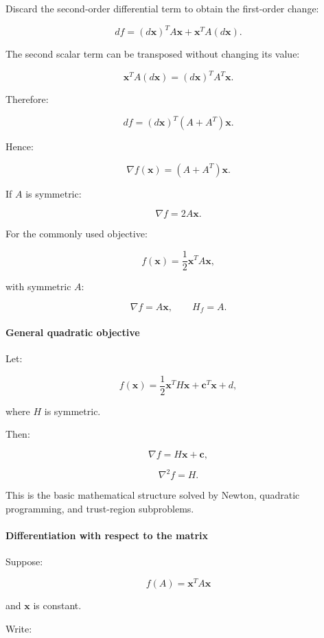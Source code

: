 Discard the second-order differential term to obtain the first-order change:

\[
df= (d\mathbf x)^TA\mathbf x+ \mathbf x^TA(d\mathbf x).
\]

The second scalar term can be transposed without changing its value:

\[
\mathbf x^TA(d\mathbf x) = (d\mathbf x)^TA^T\mathbf x.
\]

Therefore:

\[
df= (d\mathbf x)^T(A+A^T)\mathbf x.
\]

Hence:

\[
\boxed{ \nabla f(\mathbf x)=(A+A^T)\mathbf x }.
\]

If \(A\) is symmetric:

\[
\boxed{ \nabla f=2A\mathbf x }.
\]

For the commonly used objective:

\[
f(\mathbf x)=\frac12\mathbf x^TA\mathbf x,
\]

with symmetric \(A\):

\[
\boxed{ \nabla f=A\mathbf x, \qquad H_f=A }.
\]

\paragraph{General quadratic objective}\label{02-foundations-ii-ch027-general-quadratic-objective}

Let:

\[
f(\mathbf x)= \frac12\mathbf x^TH\mathbf x+ \mathbf c^T\mathbf x+d,
\]

where \(H\) is symmetric.

Then:

\[
\boxed{ \nabla f=H\mathbf x+\mathbf c },
\]

\[
\boxed{ \nabla^2f=H }.
\]

This is the basic mathematical structure solved by Newton, quadratic programming, and trust-region subproblems.

\paragraph{Differentiation with respect to the matrix}\label{02-foundations-ii-ch027-differentiation-with-respect-to-the-matrix}

Suppose:

\[
f(A)=\mathbf x^TA\mathbf x
\]

and \(\mathbf x\) is constant.

Write:

